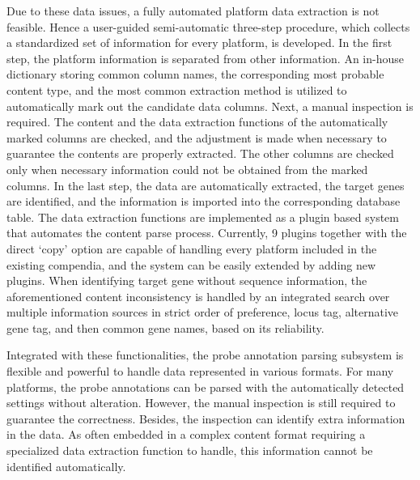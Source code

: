 Due to these data issues, a fully automated platform data extraction is not
feasible.
%
Hence a user-guided semi-automatic three-step procedure, which collects a
standardized set of information for every platform, is developed.
%
In the first step, the platform information is separated from other
information.
%
An in-house dictionary storing common column names, the corresponding most
probable content type, and the most common extraction method is utilized to
automatically mark out the candidate data columns.
%
Next, a manual inspection is required.
%
The content and the data extraction functions of the automatically marked
columns are checked, and the adjustment is made when necessary to guarantee the
contents are properly extracted.
%
The other columns are checked only when necessary information could not be
obtained from the marked columns.
%
In the last step, the data are automatically extracted, the target genes are
identified, and the information is imported into the corresponding database
table.
%
The data extraction functions are implemented as a plugin based system that
automates the content parse process.  Currently, 9 plugins together with the
direct `copy' option are capable of handling every platform included in the
existing compendia, and the system can be easily extended by adding new
plugins.
%
When identifying target gene without sequence information, the aforementioned
content inconsistency is handled by an integrated search over multiple
information sources in strict order of preference, locus tag, alternative gene
tag, and then common gene names, based on its reliability.


Integrated with these functionalities, the probe annotation parsing subsystem
is flexible and powerful to handle data represented in various formats.
%
For many platforms, the probe annotations can be parsed with the automatically
detected settings without alteration.
%
%
However, the manual inspection is still required to guarantee the correctness.
Besides, the inspection can identify extra information in the data.  As often
embedded in a complex content format requiring a specialized data extraction
function to handle, this information cannot be identified automatically.




